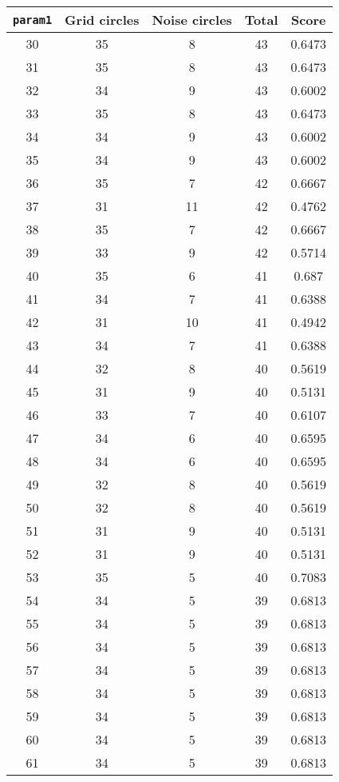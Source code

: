 \documentclass[letterpaper, 12pt]{article}
\begin{document}
\begin{longtable}{|c|c|c|c|c|}
\hline
\textbf{\texttt{param1}} & \textbf{Grid circles} & \textbf{Noise circles} & \textbf{Total} & \textbf{Score} \\
\hline
30 & 35 & 8 & 43 & 0.6473 \\
\hline
31 & 35 & 8 & 43 & 0.6473 \\
\hline
32 & 34 & 9 & 43 & 0.6002 \\
\hline
33 & 35 & 8 & 43 & 0.6473 \\
\hline
34 & 34 & 9 & 43 & 0.6002 \\
\hline
35 & 34 & 9 & 43 & 0.6002 \\
\hline
36 & 35 & 7 & 42 & 0.6667 \\
\hline
37 & 31 & 11 & 42 & 0.4762 \\
\hline
38 & 35 & 7 & 42 & 0.6667 \\
\hline
39 & 33 & 9 & 42 & 0.5714 \\
\hline
40 & 35 & 6 & 41 & 0.687 \\
\hline
41 & 34 & 7 & 41 & 0.6388 \\
\hline
42 & 31 & 10 & 41 & 0.4942 \\
\hline
43 & 34 & 7 & 41 & 0.6388 \\
\hline
44 & 32 & 8 & 40 & 0.5619 \\
\hline
45 & 31 & 9 & 40 & 0.5131 \\
\hline
46 & 33 & 7 & 40 & 0.6107 \\
\hline
47 & 34 & 6 & 40 & 0.6595 \\
\hline
48 & 34 & 6 & 40 & 0.6595 \\
\hline
49 & 32 & 8 & 40 & 0.5619 \\
\hline
50 & 32 & 8 & 40 & 0.5619 \\
\hline
51 & 31 & 9 & 40 & 0.5131 \\
\hline
52 & 31 & 9 & 40 & 0.5131 \\
\hline
53 & 35 & 5 & 40 & 0.7083 \\
\hline
54 & 34 & 5 & 39 & 0.6813 \\
\hline
55 & 34 & 5 & 39 & 0.6813 \\
\hline
56 & 34 & 5 & 39 & 0.6813 \\
\hline
57 & 34 & 5 & 39 & 0.6813 \\
\hline
58 & 34 & 5 & 39 & 0.6813 \\
\hline
59 & 34 & 5 & 39 & 0.6813 \\
\hline
60 & 34 & 5 & 39 & 0.6813 \\
\hline
61 & 34 & 5 & 39 & 0.6813 \\

\end{longtable}
\end{document}

